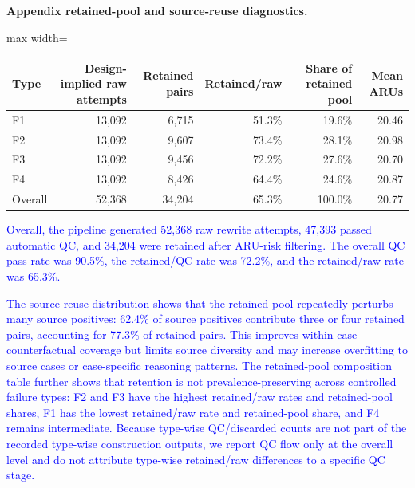 \documentclass[12pt]{article}
\newcommand{\added}[1]{\textcolor{blue}{#1}}
\begin{document}
\textbf{Appendix retained-pool and source-reuse diagnostics.}
\begin{displayquote}
\captionof{table}{\added{Type-wise retained-pool composition for the constructed preference dataset.}}
\begin{adjustbox}{max width=\linewidth}
\begin{tabular}{lrrrrr}
\toprule
\textbf{Type} & \textbf{Design-implied raw attempts} & \textbf{Retained pairs} & \textbf{Retained/raw} & \textbf{Share of retained pool} & \textbf{Mean ARUs} \\
\midrule
F1 & 13,092 & 6,715 & 51.3\% & 19.6\% & 20.46 \\
F2 & 13,092 & 9,607 & 73.4\% & 28.1\% & 20.98 \\
F3 & 13,092 & 9,456 & 72.2\% & 27.6\% & 20.70 \\
F4 & 13,092 & 8,426 & 64.4\% & 24.6\% & 20.87 \\
\midrule
Overall & 52,368 & 34,204 & 65.3\% & 100.0\% & 20.77 \\
\bottomrule
\end{tabular}
\end{adjustbox}

\added{Overall, the pipeline generated 52,368 raw rewrite attempts, 47,393 passed automatic QC, and 34,204 were retained after ARU-risk filtering. The overall QC pass rate was 90.5\%, the retained/QC rate was 72.2\%, and the retained/raw rate was 65.3\%.}

\added{The source-reuse distribution shows that the retained pool repeatedly perturbs many source positives: 62.4\% of source positives contribute three or four retained pairs, accounting for 77.3\% of retained pairs. This improves within-case counterfactual coverage but limits source diversity and may increase overfitting to source cases or case-specific reasoning patterns. The retained-pool composition table further shows that retention is not prevalence-preserving across controlled failure types: F2 and F3 have the highest retained/raw rates and retained-pool shares, F1 has the lowest retained/raw rate and retained-pool share, and F4 remains intermediate. Because type-wise QC/discarded counts are not part of the recorded type-wise construction outputs, we report QC flow only at the overall level and do not attribute type-wise retained/raw differences to a specific QC stage.}
\end{displayquote}
\end{document}
